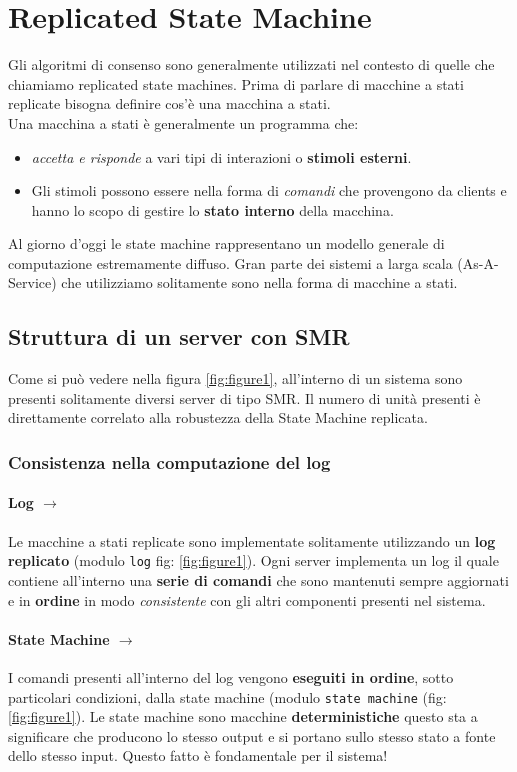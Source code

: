 	\section{Replicated State Machine}
	Gli algoritmi di consenso sono generalmente utilizzati nel contesto di quelle che chiamiamo replicated state machines. Prima di parlare di macchine a stati replicate bisogna definire cos'è una macchina a stati.\\
	Una macchina a stati è generalmente un programma che: 
	\begin{itemize}
		\item{\textit{accetta e risponde} a vari tipi di interazioni o \textbf{stimoli esterni}.}
		\item{Gli stimoli possono essere nella forma di \textit{comandi} che provengono da clients e hanno lo scopo di gestire lo \textbf{stato interno} della macchina.}
	\end{itemize}
	Al giorno d'oggi le state machine rappresentano un modello generale di computazione estremamente diffuso. Gran parte dei sistemi a larga scala (As-A-Service) che utilizziamo solitamente sono nella forma di macchine a stati.

	\subsection{Struttura di un server con SMR}
	Come si può vedere nella figura \ref{fig:figure1}, all'interno di un sistema sono presenti solitamente diversi server di tipo SMR. Il numero di unità presenti è direttamente correlato alla robustezza della State Machine replicata.

		\subsubsection{Consistenza nella computazione del log}
			\paragraph{Log $\rightarrow$}
			Le macchine a stati replicate sono implementate solitamente utilizzando un \textbf{log replicato}  (modulo \texttt{log} fig: \ref{fig:figure1}). Ogni server implementa un log il quale contiene all'interno una \textbf{serie di comandi} che sono mantenuti sempre aggiornati e in \textbf{ordine} in modo \textit{consistente} con gli altri componenti presenti nel sistema.
			\paragraph{State Machine $\rightarrow$}
			I comandi presenti all'interno del log vengono \textbf{eseguiti in ordine}, sotto particolari condizioni, dalla state machine (modulo \texttt{state machine} (fig: \ref{fig:figure1}). Le state machine sono macchine \textbf{deterministiche} questo sta a significare che producono lo stesso output e si portano sullo stesso stato a fonte dello stesso input. Questo fatto è fondamentale per il sistema!
